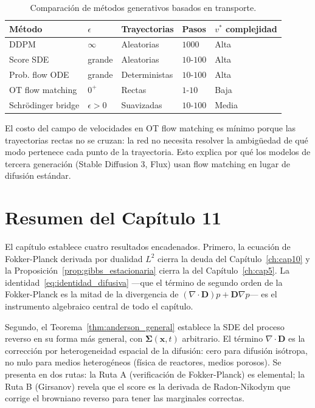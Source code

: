\begin{table}[h]
\centering
\begin{tabular}{lllll}
\toprule
\textbf{Método} & $\epsilon$ & \textbf{Trayectorias} & \textbf{Pasos} & \textbf{$v^*$ complejidad} \\
\midrule
DDPM & $\infty$ & Aleatorias & $1000$ & Alta \\
Score SDE & grande & Aleatorias & $10$-$100$ & Alta \\
Prob. flow ODE & grande & Deterministas & $10$-$100$ & Alta \\
OT flow matching & $0^+$ & Rectas & $1$-$10$ & Baja \\
\midrule
Schrödinger bridge & $\epsilon>0$ & Suavizadas & $10$-$100$ & Media \\
\bottomrule
\end{tabular}
\caption{Comparación de métodos generativos basados en transporte.}
\label{tab:comparacion}
\end{table}

El costo del campo de velocidades en OT flow matching es mínimo porque las
trayectorias rectas no se cruzan: la red no necesita resolver la ambigüedad
de qué modo pertenece cada punto de la trayectoria. Esto explica por qué los
modelos de tercera generación (Stable Diffusion 3, Flux) usan flow matching
en lugar de difusión estándar.

\section{Resumen del Capítulo 11}
\label{sec:resumen11}

El capítulo establece cuatro resultados encadenados. Primero, la ecuación de
Fokker-Planck derivada por dualidad $L^2$ cierra la deuda del Capítulo~\ref{ch:cap10} y
la Proposición~\ref{prop:gibbs_estacionaria} cierra la del Capítulo~\ref{ch:cap5}. La
identidad~\eqref{eq:identidad_difusiva} —que el término de segundo orden de la
Fokker-Planck es la mitad de la divergencia de $(\nabla\cdot\bm{D})p + \bm{D}\nabla p$—
es el instrumento algebraico central de todo el capítulo.

Segundo, el Teorema~\ref{thm:anderson_general} establece la SDE del proceso
reverso en su forma más general, con $\bm{\Sigma}(\bm{x},t)$ arbitrario. El
término $\nabla\cdot\bm{D}$ es la corrección por heterogeneidad espacial de la
difusión: cero para difusión isótropa, no nulo para medios heterogéneos (física
de reactores, medios porosos). Se presenta en dos rutas: la Ruta A (verificación
de Fokker-Planck) es elemental; la Ruta B (Girsanov) revela que el score es la
derivada de Radon-Nikodym que corrige el browniano reverso para tener las
marginales correctas.

